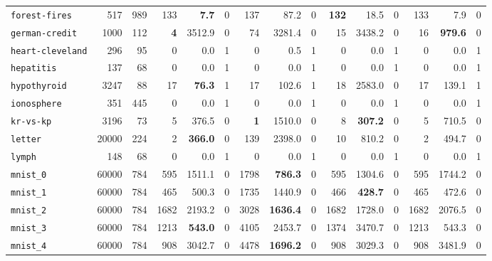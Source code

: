 \begin{tabular}{lccrrrrrrrrrrrr}
\texttt{forest-fires} & \multicolumn{1}{r}{517} & \multicolumn{1}{r}{989}  & 133 & \textbf{7.7} & 0 & 137 & 87.2 & 0 & \textbf{132} & 18.5 & 0 & 133 & 7.9 & 0\\
\texttt{german-credit} & \multicolumn{1}{r}{1000} & \multicolumn{1}{r}{112}  & \textbf{4} & 3512.9 & 0 & 74 & 3281.4 & 0 & 15 & 3438.2 & 0 & 16 & \textbf{979.6} & 0\\
\texttt{heart-cleveland} & \multicolumn{1}{r}{296} & \multicolumn{1}{r}{95}  & 0 & 0.0 & 1 & 0 & 0.5 & 1 & 0 & 0.0 & 1 & 0 & 0.0 & 1\\
\texttt{hepatitis} & \multicolumn{1}{r}{137} & \multicolumn{1}{r}{68}  & 0 & 0.0 & 1 & 0 & 0.0 & 1 & 0 & 0.0 & 1 & 0 & 0.0 & 1\\
\texttt{hypothyroid} & \multicolumn{1}{r}{3247} & \multicolumn{1}{r}{88}  & 17 & \textbf{76.3} & 1 & 17 & 102.6 & 1 & 18 & 2583.0 & 0 & 17 & 139.1 & 1\\
\texttt{ionosphere} & \multicolumn{1}{r}{351} & \multicolumn{1}{r}{445}  & 0 & 0.0 & 1 & 0 & 0.0 & 1 & 0 & 0.0 & 1 & 0 & 0.0 & 1\\
\texttt{kr-vs-kp} & \multicolumn{1}{r}{3196} & \multicolumn{1}{r}{73}  & 5 & 376.5 & 0 & \textbf{1} & 1510.0 & 0 & 8 & \textbf{307.2} & 0 & 5 & 710.5 & 0\\
\texttt{letter} & \multicolumn{1}{r}{20000} & \multicolumn{1}{r}{224}  & 2 & \textbf{366.0} & 0 & 139 & 2398.0 & 0 & 10 & 810.2 & 0 & 2 & 494.7 & 0\\
\texttt{lymph} & \multicolumn{1}{r}{148} & \multicolumn{1}{r}{68}  & 0 & 0.0 & 1 & 0 & 0.0 & 1 & 0 & 0.0 & 1 & 0 & 0.0 & 1\\
\texttt{mnist\_0} & \multicolumn{1}{r}{60000} & \multicolumn{1}{r}{784}  & 595 & 1511.1 & 0 & 1798 & \textbf{786.3} & 0 & 595 & 1304.6 & 0 & 595 & 1744.2 & 0\\
\texttt{mnist\_1} & \multicolumn{1}{r}{60000} & \multicolumn{1}{r}{784}  & 465 & 500.3 & 0 & 1735 & 1440.9 & 0 & 466 & \textbf{428.7} & 0 & 465 & 472.6 & 0\\
\texttt{mnist\_2} & \multicolumn{1}{r}{60000} & \multicolumn{1}{r}{784}  & 1682 & 2193.2 & 0 & 3028 & \textbf{1636.4} & 0 & 1682 & 1728.0 & 0 & 1682 & 2076.5 & 0\\
\texttt{mnist\_3} & \multicolumn{1}{r}{60000} & \multicolumn{1}{r}{784}  & 1213 & \textbf{543.0} & 0 & 4105 & 2453.7 & 0 & 1374 & 3470.7 & 0 & 1213 & 543.3 & 0\\
\texttt{mnist\_4} & \multicolumn{1}{r}{60000} & \multicolumn{1}{r}{784}  & 908 & 3042.7 & 0 & 4478 & \textbf{1696.2} & 0 & 908 & 3029.3 & 0 & 908 & 3481.9 & 0\\

\end{tabular}
